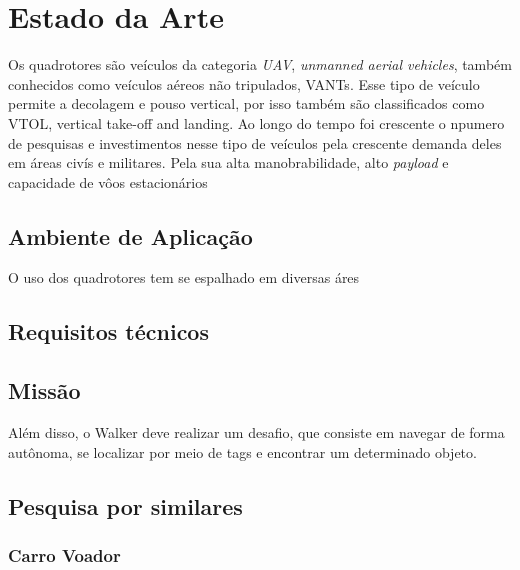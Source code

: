 \chapter{Estado da Arte}
\label{chap:fundteor}
Os quadrotores são veículos da categoria \textit{UAV}, \textit{unmanned aerial vehicles}, também conhecidos como veículos aéreos não tripulados, VANTs. Esse tipo de veículo permite a decolagem e pouso vertical, por isso também são classificados como VTOL, vertical take-off and landing. Ao longo do tempo foi crescente o npumero de pesquisas e investimentos nesse tipo de veículos pela crescente demanda deles em áreas civís e militares. Pela sua alta manobrabilidade, alto \textit{payload} e capacidade de vôos estacionários



\section{Ambiente de Aplicação}
O uso dos quadrotores tem se espalhado em diversas áres


\section{Requisitos técnicos}


   \lipsum[2-4]

 \section{Missão}
 \lipsum
 Além disso, o Walker deve realizar um desafio, que consiste em navegar de forma autônoma, se localizar por meio de tags e encontrar um determinado objeto.


 \section{Pesquisa por similares}

\lipsum[1]

 \subsection{Carro Voador}
 \lipsum[2-4]




